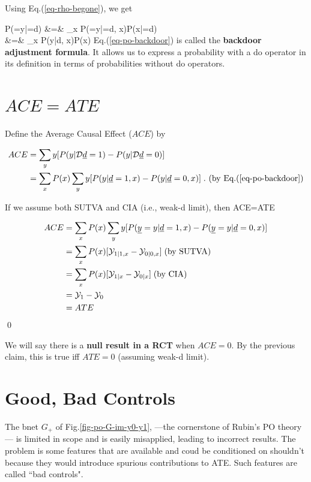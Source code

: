 Using Eq.(\ref{eq-rho-begone}), we get

\beqa
P(\rvy=y|\cald\rvd=d)
&=&
\sum_x 
P(\rvy=y|\cald\rvd=d, x)P(x|\cald\rvd=d)
\\
&=&
\sum_x 
P(y|d, x)P(x)
\label{eq-po-backdoor}
\eeqa
Eq.(\ref{eq-po-backdoor})
is called the {\bf backdoor adjustment formula}.
It allows us to
express a
probability
with a do operator
in its definition
in terms 
of  probabilities
without do operators.

\section{$ACE=ATE$}



Define the Average
Causal Effect ($ACE$) by

\begin{align}
ACE&=\sum_y y
[P(y|{\cal D}{\underline{d}}=1)-P(y|{\cal D}{\underline{d}}=0)]
\\
&=
\sum_x P(x)\sum_y y [P(y|{\underline{d}}=1,x)-P(y|{\underline{d}}=0,x)]
\;. \text{ (by Eq.(\ref{eq-po-backdoor})}
\label{eq-my-backdoor-proof} 
\end{align}


\begin{claim}\label{cl-ace-ate}
If we assume both SUTVA and 
CIA (i.e., weak-d limit), then
\beq
ACE=ATE
\eeq
\end{claim}
\proof



\begin{align}
ACE&=
\sum_x P(x)\sum_y y [P({\underline{y}}=y|{\underline{d}}=1,x)-
P({\underline{y}}=y|{\underline{d}}=0,x)] 
\\
&=\sum_x P(x)[{\cal Y}_{1|1, x}-{\cal Y}_{0|0, x}]
\;\text{(by SUTVA)}
\\
&=\sum_x P(x)[{\cal Y}_{1|x}-{\cal Y}_{0|x}]
\;\text{(by CIA)}
\\
&=
{\cal Y}_{1}-{\cal Y}_{0}
\\
&=
ATE
\end{align}
\qed

We will say there is a {\bf null result
in a RCT} when $ACE=0$. By the previous claim, 
this is true iff $ATE=0$
(assuming weak-d limit).

\section{Good, Bad Controls}

The bnet $G_+$
of Fig.\ref{fig-po-G-im-y0-y1}, 
---the cornerstone of Rubin's 
PO theory--- is limited in scope
and is easily
misapplied, leading
to incorrect results.
The problem is 
some features
that are available 
and coud be conditioned on
shouldn't because they
would introduce spurious
contributions to ATE.
Such features are called
``bad controls".

